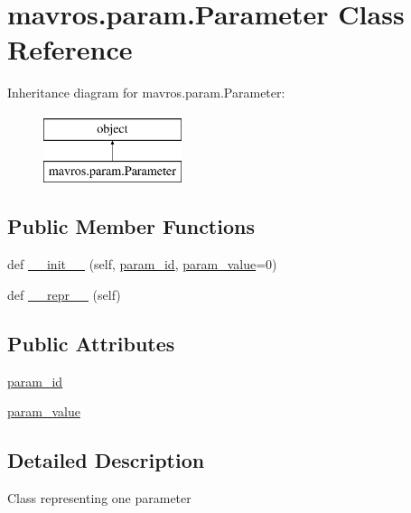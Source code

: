 \hypertarget{classmavros_1_1param_1_1Parameter}{}\section{mavros.\+param.\+Parameter Class Reference}
\label{classmavros_1_1param_1_1Parameter}
Inheritance diagram for mavros.\+param.\+Parameter\+:\begin{figure}[H]
\begin{center}
\leavevmode
\includegraphics[height=2.000000cm]{classmavros_1_1param_1_1Parameter}
\end{center}
\end{figure}
\subsection*{Public Member Functions}
\begin{DoxyCompactItemize}
\item 
def \mbox{\hyperlink{classmavros_1_1param_1_1Parameter_a5b610dd3a7456ae623f1ee491ca6b15a}{\+\_\+\+\_\+init\+\_\+\+\_\+}} (self, \mbox{\hyperlink{classmavros_1_1param_1_1Parameter_ad7662fefa22c2bc13f28338838fe77ce}{param\+\_\+id}}, \mbox{\hyperlink{classmavros_1_1param_1_1Parameter_a7cb16638f293dd3702452ddb03ac1222}{param\+\_\+value}}=0)
\item 
def \mbox{\hyperlink{classmavros_1_1param_1_1Parameter_aaea16c91991f42b0ff901259d5216568}{\+\_\+\+\_\+repr\+\_\+\+\_\+}} (self)
\end{DoxyCompactItemize}
\subsection*{Public Attributes}
\begin{DoxyCompactItemize}
\item 
\mbox{\hyperlink{classmavros_1_1param_1_1Parameter_ad7662fefa22c2bc13f28338838fe77ce}{param\+\_\+id}}
\item 
\mbox{\hyperlink{classmavros_1_1param_1_1Parameter_a7cb16638f293dd3702452ddb03ac1222}{param\+\_\+value}}
\end{DoxyCompactItemize}


\subsection{Detailed Description}
\begin{DoxyVerb}Class representing one parameter\end{DoxyVerb}
 

